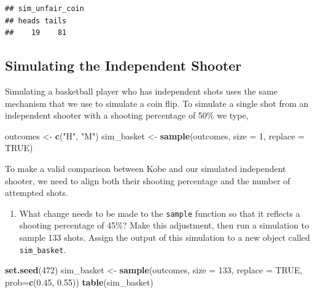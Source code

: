 \documentclass[]{article}
\newenvironment{Shaded}{\begin{snugshade}}{\end{snugshade}}
\newcommand{\KeywordTok}[1]{\textcolor[rgb]{0.13,0.29,0.53}{\textbf{{#1}}}}
\newcommand{\DataTypeTok}[1]{\textcolor[rgb]{0.13,0.29,0.53}{{#1}}}
\newcommand{\DecValTok}[1]{\textcolor[rgb]{0.00,0.00,0.81}{{#1}}}
\newcommand{\FloatTok}[1]{\textcolor[rgb]{0.00,0.00,0.81}{{#1}}}
\newcommand{\StringTok}[1]{\textcolor[rgb]{0.31,0.60,0.02}{{#1}}}
\newcommand{\OtherTok}[1]{\textcolor[rgb]{0.56,0.35,0.01}{{#1}}}
\newcommand{\NormalTok}[1]{{#1}}
\providecommand{\tightlist}{%
  \setlength{\itemsep}{0pt}\setlength{\parskip}{0pt}}
\begin{document}
\begin{verbatim}
## sim_unfair_coin
## heads tails 
##    19    81
\end{verbatim}

\subsection{Simulating the Independent
Shooter}\label{simulating-the-independent-shooter}

Simulating a basketball player who has independent shots uses the same
mechanism that we use to simulate a coin flip. To simulate a single shot
from an independent shooter with a shooting percentage of 50\% we type,

\begin{Shaded}
\begin{Highlighting}[]
\NormalTok{outcomes <-}\StringTok{ }\KeywordTok{c}\NormalTok{(}\StringTok{"H"}\NormalTok{, }\StringTok{"M"}\NormalTok{)}
\NormalTok{sim_basket <-}\StringTok{ }\KeywordTok{sample}\NormalTok{(outcomes, }\DataTypeTok{size =} \DecValTok{1}\NormalTok{, }\DataTypeTok{replace =} \OtherTok{TRUE}\NormalTok{)}
\end{Highlighting}
\end{Shaded}

To make a valid comparison between Kobe and our simulated independent
shooter, we need to align both their shooting percentage and the number
of attempted shots.

\begin{enumerate}
\def\labelenumi{\arabic{enumi}.}
\setcounter{enumi}{3}
\tightlist
\item
  What change needs to be made to the \texttt{sample} function so that
  it reflects a shooting percentage of 45\%? Make this adjustment, then
  run a simulation to sample 133 shots. Assign the output of this
  simulation to a new object called \texttt{sim\_basket}.
\end{enumerate}

\begin{Shaded}
\begin{Highlighting}[]
\KeywordTok{set.seed}\NormalTok{(}\DecValTok{472}\NormalTok{)}
\NormalTok{sim_basket <-}\StringTok{ }\KeywordTok{sample}\NormalTok{(outcomes, }\DataTypeTok{size =} \DecValTok{133}\NormalTok{, }\DataTypeTok{replace =} \OtherTok{TRUE}\NormalTok{, }\DataTypeTok{prob=}\KeywordTok{c}\NormalTok{(}\FloatTok{0.45}\NormalTok{, }\FloatTok{0.55}\NormalTok{))}
\KeywordTok{table}\NormalTok{(sim_basket)}
\end{Highlighting}
\end{Shaded}
\end{document}
